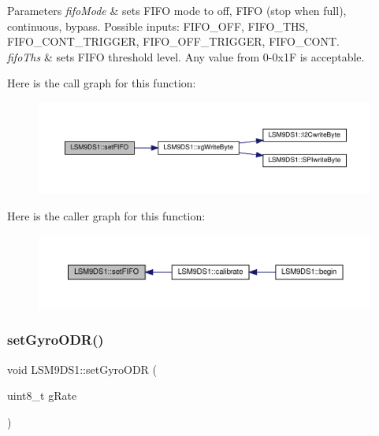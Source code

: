 \begin{DoxyParams}{Parameters}
{\em fifo\+Mode} & sets F\+I\+FO mode to off, F\+I\+FO (stop when full), continuous, bypass. Possible inputs\+: F\+I\+F\+O\+\_\+\+O\+FF, F\+I\+F\+O\+\_\+\+T\+HS, F\+I\+F\+O\+\_\+\+C\+O\+N\+T\+\_\+\+T\+R\+I\+G\+G\+ER, F\+I\+F\+O\+\_\+\+O\+F\+F\+\_\+\+T\+R\+I\+G\+G\+ER, F\+I\+F\+O\+\_\+\+C\+O\+NT. \\
\hline
{\em fifo\+Ths} & sets F\+I\+FO threshold level. Any value from 0-\/0x1F is acceptable. \\
\hline
\end{DoxyParams}
Here is the call graph for this function\+:\nopagebreak
\begin{figure}[H]
\begin{center}
\leavevmode
\includegraphics[width=350pt]{classLSM9DS1_a0ec4a93a34545af1acc336bae9b360f1_cgraph}
\end{center}
\end{figure}
Here is the caller graph for this function\+:\nopagebreak
\begin{figure}[H]
\begin{center}
\leavevmode
\includegraphics[width=350pt]{classLSM9DS1_a0ec4a93a34545af1acc336bae9b360f1_icgraph}
\end{center}
\end{figure}
\mbox{\label{classLSM9DS1_ab8fc33c8da4fc5c379e880ff57d331fa}} 
\subsubsection{\texorpdfstring{set\+Gyro\+O\+D\+R()}{setGyroODR()}}
{\footnotesize\ttfamily void L\+S\+M9\+D\+S1\+::set\+Gyro\+O\+DR (\begin{DoxyParamCaption}\item[{uint8\+\_\+t}]{g\+Rate }\end{DoxyParamCaption})}



